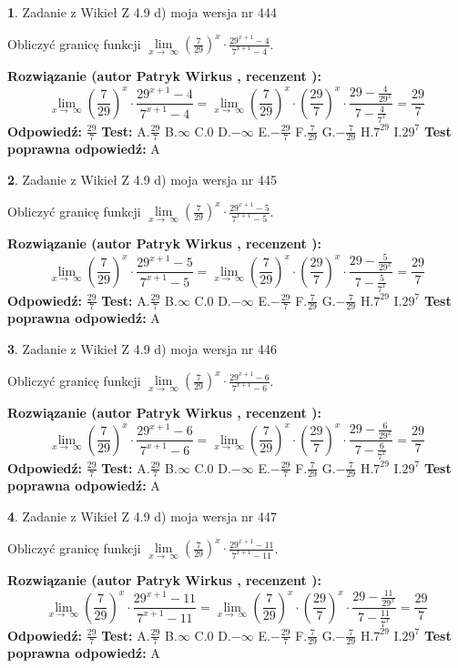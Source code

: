 \documentclass[12pt, a4paper]{article}
\theoremstyle{definition} %
\newtheorem{zad}{}
\newcommand{\zadStart}[1]{\begin{zad}#1\newline}
\newcommand{\zadStop}{\end{zad}}
\newcommand{\rozwStart}[2]{\noindent \textbf{Rozwiązanie (autor #1 , recenzent #2): }\newline}
\newcommand{\rozwStop}{\newline}
\newcommand{\odpStart}{\noindent \textbf{Odpowiedź:}\newline}
\newcommand{\odpStop}{\newline}
\newcommand{\testStart}{\noindent \textbf{Test:}\newline}
\newcommand{\testStop}{\newline}
\newcommand{\kluczStart}{\noindent \textbf{Test poprawna odpowiedź:}\newline}
\newcommand{\kluczStop}{\newline}
\begin{document}
\zadStart{Zadanie z Wikieł Z 4.9 d) moja wersja nr 444}


Obliczyć granicę funkcji  $\lim\limits_{x\to\ \infty}(\frac{7}{29})^{x}\cdot\frac{29^{x+1}-4}{7^{x+1}-4}$.
\zadStop
\rozwStart{Patryk Wirkus}{}
$$\lim\limits_{x\to\ \infty}(\frac{7}{29})^{x}\cdot\frac{29^{x+1}-4}{7^{x+1}-4}=\lim\limits_{x\to\ \infty}(\frac{7}{29})^{x}\cdot(\frac{29}{7})^{x} \cdot \frac{29-\frac{4}{29^{x}}}{7-\frac{4}{7^{x}}} = \frac{29}{7}$$
\rozwStop
\odpStart
$\frac{29}{7}$
\odpStop
\testStart
A.$\frac{29}{7}$ B.$\infty$ C.$0$ D.$-\infty$ E.$-\frac{29}{7}$
F.$\frac{7}{29}$ G.$-\frac{7}{29}$
H.$7^{29}$
I.$29^{7}$
\testStop
\kluczStart
A
\kluczStop



\zadStart{Zadanie z Wikieł Z 4.9 d) moja wersja nr 445}


Obliczyć granicę funkcji  $\lim\limits_{x\to\ \infty}(\frac{7}{29})^{x}\cdot\frac{29^{x+1}-5}{7^{x+1}-5}$.
\zadStop
\rozwStart{Patryk Wirkus}{}
$$\lim\limits_{x\to\ \infty}(\frac{7}{29})^{x}\cdot\frac{29^{x+1}-5}{7^{x+1}-5}=\lim\limits_{x\to\ \infty}(\frac{7}{29})^{x}\cdot(\frac{29}{7})^{x} \cdot \frac{29-\frac{5}{29^{x}}}{7-\frac{5}{7^{x}}} = \frac{29}{7}$$
\rozwStop
\odpStart
$\frac{29}{7}$
\odpStop
\testStart
A.$\frac{29}{7}$ B.$\infty$ C.$0$ D.$-\infty$ E.$-\frac{29}{7}$
F.$\frac{7}{29}$ G.$-\frac{7}{29}$
H.$7^{29}$
I.$29^{7}$
\testStop
\kluczStart
A
\kluczStop



\zadStart{Zadanie z Wikieł Z 4.9 d) moja wersja nr 446}


Obliczyć granicę funkcji  $\lim\limits_{x\to\ \infty}(\frac{7}{29})^{x}\cdot\frac{29^{x+1}-6}{7^{x+1}-6}$.
\zadStop
\rozwStart{Patryk Wirkus}{}
$$\lim\limits_{x\to\ \infty}(\frac{7}{29})^{x}\cdot\frac{29^{x+1}-6}{7^{x+1}-6}=\lim\limits_{x\to\ \infty}(\frac{7}{29})^{x}\cdot(\frac{29}{7})^{x} \cdot \frac{29-\frac{6}{29^{x}}}{7-\frac{6}{7^{x}}} = \frac{29}{7}$$
\rozwStop
\odpStart
$\frac{29}{7}$
\odpStop
\testStart
A.$\frac{29}{7}$ B.$\infty$ C.$0$ D.$-\infty$ E.$-\frac{29}{7}$
F.$\frac{7}{29}$ G.$-\frac{7}{29}$
H.$7^{29}$
I.$29^{7}$
\testStop
\kluczStart
A
\kluczStop



\zadStart{Zadanie z Wikieł Z 4.9 d) moja wersja nr 447}


Obliczyć granicę funkcji  $\lim\limits_{x\to\ \infty}(\frac{7}{29})^{x}\cdot\frac{29^{x+1}-11}{7^{x+1}-11}$.
\zadStop
\rozwStart{Patryk Wirkus}{}
$$\lim\limits_{x\to\ \infty}(\frac{7}{29})^{x}\cdot\frac{29^{x+1}-11}{7^{x+1}-11}=\lim\limits_{x\to\ \infty}(\frac{7}{29})^{x}\cdot(\frac{29}{7})^{x} \cdot \frac{29-\frac{11}{29^{x}}}{7-\frac{11}{7^{x}}} = \frac{29}{7}$$
\rozwStop
\odpStart
$\frac{29}{7}$
\odpStop
\testStart
A.$\frac{29}{7}$ B.$\infty$ C.$0$ D.$-\infty$ E.$-\frac{29}{7}$
F.$\frac{7}{29}$ G.$-\frac{7}{29}$
H.$7^{29}$
I.$29^{7}$
\testStop
\kluczStart
A
\kluczStop
\end{document}
